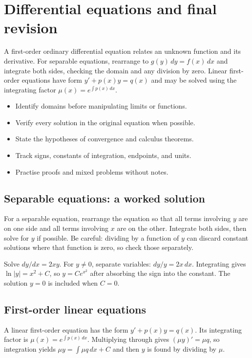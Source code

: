 \documentclass[12pt,a4paper]{article}
\begin{document}
\section{Differential equations and final revision}
A first-order ordinary differential equation relates an unknown function and its derivative. For separable equations, rearrange to $g(y)\,dy=f(x)\,dx$ and integrate both sides, checking the domain and any division by zero. Linear first-order equations have form $y'+p(x)y=q(x)$ and may be solved using the integrating factor $\mu(x)=e^{\int p(x)\,dx}$.
\begin{itemize}
\item Identify domains before manipulating limits or functions.
\item Verify every solution in the original equation when possible.
\item State the hypotheses of convergence and calculus theorems.
\item Track signs, constants of integration, endpoints, and units.
\item Practise proofs and mixed problems without notes.
\end{itemize}
\subsection{Separable equations: a worked solution}
For a separable equation, rearrange the equation so that all terms involving $y$ are on one side and all terms involving $x$ are on the other. Integrate both sides, then solve for $y$ if possible. Be careful: dividing by a function of $y$ can discard constant solutions where that function is zero, so check those separately.

\begin{exampleBox}Solve $dy/dx=2xy$. For $y\ne0$, separate variables: $dy/y=2x\,dx$. Integrating gives $\ln|y|=x^2+C$, so $y=Ce^{x^2}$ after absorbing the sign into the constant. The solution $y=0$ is included when $C=0$.
\end{exampleBox}

\subsection{First-order linear equations}
A linear first-order equation has the form $y'+p(x)y=q(x)$. Its integrating factor is $\mu(x)=e^{\int p(x)\,dx}$. Multiplying through gives $(\mu y)'=\mu q$, so integration yields $\mu y=\int\mu q\,dx+C$ and then $y$ is found by dividing by $\mu$.
\end{document}
